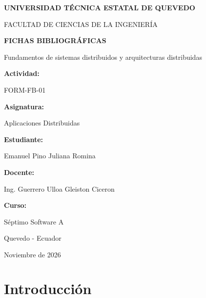 \documentclass[12pt,a4paper]{article}
\begin{document}

\begin{titlepage}
\begin{center}

{\Large\bfseries
UNIVERSIDAD TÉCNICA ESTATAL
DE QUEVEDO}

\vspace{1.5cm}

{\large
FACULTAD DE CIENCIAS
DE LA INGENIERÍA}

\vspace{1.5cm}

{\Large\bfseries
FICHAS BIBLIOGRÁFICAS}

\vspace{0.5cm}

{\large
Fundamentos de sistemas distribuidos
y arquitecturas distribuidas}

\vspace{1.5cm}

\textbf{Actividad:}

FORM-FB-01

\vspace{0.5cm}

\textbf{Asignatura:}

Aplicaciones Distribuidas

\vspace{0.5cm}

\textbf{Estudiante:}

Emanuel Pino Juliana Romina

\vspace{0.5cm}

\textbf{Docente:}

Ing. Guerrero Ulloa Gleiston Ciceron

\vspace{0.5cm}

\textbf{Curso:}

Séptimo Software A

\vfill

Quevedo - Ecuador

Noviembre de 2026

\end{center}
\end{titlepage}


\section{Introducción}
\end{document}
